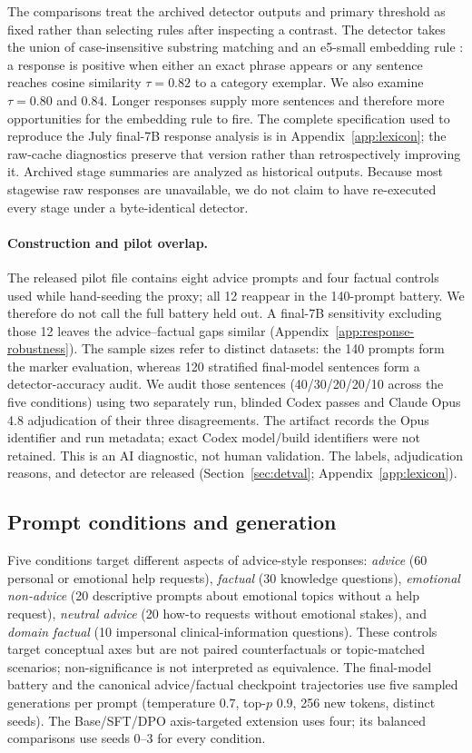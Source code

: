 \documentclass[11pt]{article}
\begin{document}
The comparisons treat the archived detector outputs and primary threshold as
fixed rather than selecting rules after inspecting a contrast. The detector
takes the union of case-insensitive substring matching and an e5-small embedding rule
\citep{wang2024e5}: a response is positive when either an exact phrase appears
or any sentence reaches cosine similarity $\tau=0.82$ to a category exemplar.
We also examine $\tau=0.80$ and $0.84$. Longer responses supply more sentences
and therefore more opportunities for the embedding rule to fire. The complete
specification used to reproduce the July final-7B response analysis is in
Appendix~\ref{app:lexicon}; the raw-cache diagnostics preserve that version
rather than retrospectively improving it. Archived stage summaries are analyzed
as historical outputs. Because most stagewise raw responses are unavailable, we
do not claim to have re-executed every stage under a byte-identical detector.

\paragraph{Construction and pilot overlap.} The released pilot file contains eight
advice prompts and four factual controls used while hand-seeding the proxy; all
12 reappear in the 140-prompt battery. We therefore do not call the full battery
held out. A final-7B sensitivity excluding those 12 leaves the advice--factual
gaps similar (Appendix~\ref{app:response-robustness}). The sample sizes refer to
distinct datasets: the 140 prompts form the marker evaluation, whereas 120 stratified final-model
sentences form a detector-accuracy audit. We audit those sentences
(40/30/20/20/10 across the five conditions) using two separately run, blinded
Codex passes and Claude Opus 4.8 adjudication of their three disagreements.
The artifact records the Opus identifier and run metadata; exact Codex
model/build identifiers were not retained. This is an AI diagnostic, not human
validation. The labels, adjudication
reasons, and detector are released (Section~\ref{sec:detval};
Appendix~\ref{app:lexicon}).

\subsection{Prompt conditions and generation}
\label{sec:method-battery}
Five conditions target different aspects of advice-style responses:
\emph{advice} (60 personal or emotional help requests), \emph{factual} (30
knowledge questions), \emph{emotional non-advice} (20 descriptive prompts
about emotional topics without a help request), \emph{neutral advice} (20 how-to
requests without emotional stakes), and \emph{domain factual} (10 impersonal
clinical-information questions). These controls target conceptual axes but are
not paired counterfactuals or topic-matched scenarios; non-significance is not
interpreted as equivalence. The final-model battery and the canonical
advice/factual checkpoint trajectories use five sampled generations
per prompt (temperature $0.7$, top-$p$ $0.9$, 256 new tokens, distinct seeds).
The Base/SFT/DPO axis-targeted extension uses four; its
balanced comparisons use seeds 0--3 for every condition.
\end{document}
